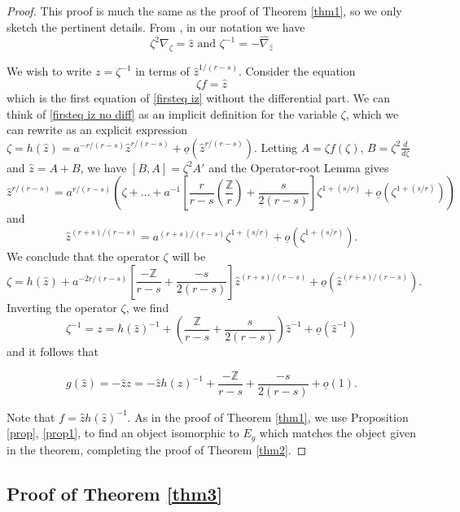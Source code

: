\documentclass[11pt]{amsart}
\theoremstyle{plain}
\theoremstyle{definition}
\theoremstyle{remark}
\def\tz{\zeta}
\def\lo{\underline{o}}
\begin{document}
\begin{proof}
This proof is much the same as the proof of Theorem \ref{thm1}, so we only sketch the pertinent details.  From \cite[Proposition 3.9]{bloch}, in our notation we have
\begin{equation}\label{firsteq iz}
    \tz^2\nabla_{\tz}=\hat{z} \text{ and } \tz^{-1}=-\hat{\nabla}_{\hat{z}}
\end{equation}

We wish to write $z=\zeta^{-1}$ in terms of $\hat{z}^{1/(r-s)}$. Consider the equation
\begin{equation}\label{firsteq iz no diff}
\zeta f=\hat{z}
\end{equation}
which is the first equation of \eqref{firsteq iz} without the differential part.  We can think of \eqref{firsteq iz no diff} as an implicit definition for the variable $\zeta$, which we can rewrite as an explicit expression $\zeta=h(\hat{z})=a^{-r/(r-s)}\hat{z}^{r/(r-s)}+\lo(\hat{z}^{r/(r-s)})$.  Letting $A=\tz f(\tz)$, $B=\tz^2\frac{d}{d\tz}$ and $\hat{z}=A+B$, we have $[B,A]=\zeta^2A'$ and the Operator-root Lemma gives
$$\hat{z}^{r/(r-s)}=a^{r/(r-s)}\left(\tz+\dots +a^{-1}\left[\frac{r}{r-s}\left(\frac{\mathbb{Z}}{r}\right)+\frac{s}{2(r-s)}\right]\tz^{1+(s/r)}+ \underline{o}(\tz^{1+(s/r)})\right)$$
and
$$\hat{z}^{(r+s)/(r-s)}=a^{(r+s)/(r-s)}\tz^{1+(s/r)}+ \underline{o}(\tz^{1+(s/r)}).$$
We conclude that the operator $\zeta$ will be
$$\tz=h(\hat{z})+a^{-2r/(r-s)}\left[\frac{-\mathbb{Z}}{r-s}+ \frac{-s}{2(r-s)}\right]\hat{z}^{(r+s)/(r-s)}+ \underline{o}(\hat{z}^{(r+s)/(r-s)}).$$
Inverting the operator $\zeta$, we find
$$\zeta^{-1}=z=h(\hat{z})^{-1}+\left(\frac{\mathbb{Z}}{r-s}+ \frac{s}{2(r-s)}\right)\hat{z}^{-1}+ \underline{o}(\hat{z}^{-1})$$
and it follows that

$$g(\hat{z})=-\hat{z} z=-\hat{z}h(\hat{z})^{-1}+\frac{-\mathbb{Z}}{r-s}+\frac{-s}{2(r-s)}+\underline{o}(1).$$

Note that $f=\hat{z}h(\hat{z})^{-1}$.  As in the proof of Theorem \ref{thm1}, we use Proposition \ref{prop}, \eqref{prop1}, to find an object isomorphic to $E_g$ which matches the object given in the theorem, completing the proof of Theorem \ref{thm2}.
\end{proof}


\subsection{Proof of Theorem \ref{thm3}}\label{subsec proof 3}
\end{document}
